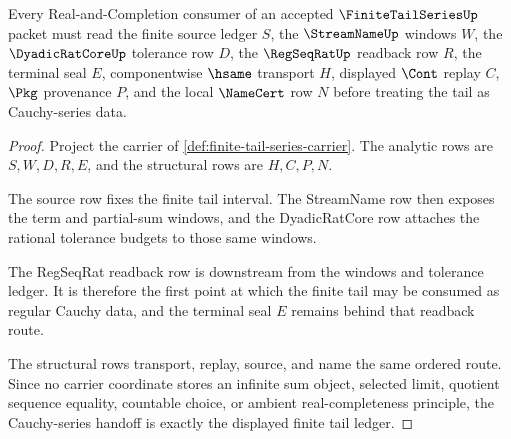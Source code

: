 \begin{theorem}
\label{thm:finite-tail-series-cauchy-handoff}
Every Real-and-Completion consumer of an accepted $\FiniteTailSeriesUp$ packet must read the finite source ledger $S$, the $\StreamNameUp$ windows $W$, the $\DyadicRatCoreUp$ tolerance row $D$, the $\RegSeqRatUp$ readback row $R$, the terminal seal $E$, componentwise $\hsame$ transport $H$, displayed $\Cont$ replay $C$, $\Pkg$ provenance $P$, and the local $\NameCert$ row $N$ before treating the tail as Cauchy-series data.
\end{theorem}
\begin{proof}
Project the carrier of \autoref{def:finite-tail-series-carrier}. The analytic rows are $S,W,D,R,E$, and the structural rows are $H,C,P,N$.

The source row fixes the finite tail interval. The StreamName row then exposes the term and partial-sum windows, and the DyadicRatCore row attaches the rational tolerance budgets to those same windows.

The RegSeqRat readback row is downstream from the windows and tolerance ledger. It is therefore the first point at which the finite tail may be consumed as regular Cauchy data, and the terminal seal $E$ remains behind that readback route.

The structural rows transport, replay, source, and name the same ordered route. Since no carrier coordinate stores an infinite sum object, selected limit, quotient sequence equality, countable choice, or ambient real-completeness principle, the Cauchy-series handoff is exactly the displayed finite tail ledger.
\end{proof}

\begin{closurestatus}{\FiniteTailSeriesUp}
  \theoryclosure{\seedClosure}
  \formalstatus{\formalTargetV}
\end{closurestatus}
